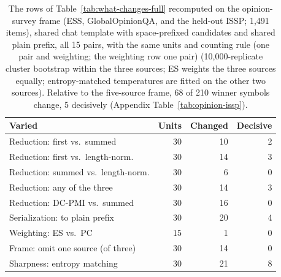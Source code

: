 \begin{table}[t]
\centering\scriptsize
\setlength{\tabcolsep}{3pt}
\begin{tabular}{@{}lrrr@{}}
\toprule
Varied & Units & Changed & Decisive \\
\midrule
Reduction: first vs.\ summed & 30 & 10 & 2 \\
Reduction: first vs.\ length-norm. & 30 & 14 & 3 \\
Reduction: summed vs.\ length-norm. & 30 & 6 & 0 \\
Reduction: any of the three & 30 & 14 & 3 \\
Reduction: DC-PMI vs.\ summed & 30 & 16 & 0 \\
Serialization: to plain prefix & 30 & 20 & 4 \\
Weighting: ES vs.\ PC & 15 & 1 & 0 \\
Frame: omit one source (of three) & 30 & 14 & 0 \\
Sharpness: entropy matching & 30 & 21 & 8 \\
\bottomrule
\end{tabular}
\caption{The rows of Table~\ref{tab:what-changes-full} recomputed on the opinion-survey frame (ESS, GlobalOpinionQA, and the held-out ISSP; 1,491 items), shared chat template with space-prefixed candidates and shared plain prefix, all 15 pairs, with the same units and counting rule (one pair and weighting; the weighting row one pair) (10,000-replicate cluster bootstrap within the three sources; ES weights the three sources equally; entropy-matched temperatures are fitted on the other two sources). Relative to the five-source frame, 68 of 210 winner symbols change, 5 decisively (Appendix Table~\ref{tab:opinion-issp}).}
\label{tab:opinion-frame-changes}
\end{table}
